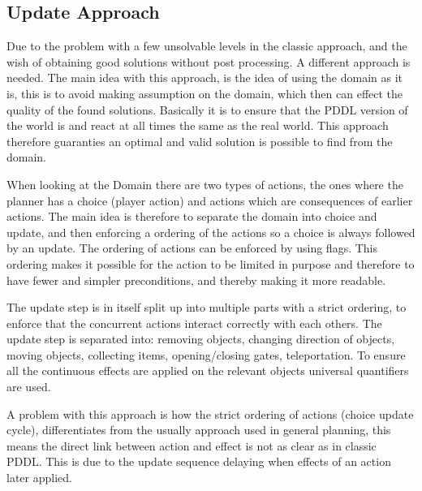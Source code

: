 		\subsection{Update Approach}
		Due to the problem with a few unsolvable levels in the classic approach, and the wish of obtaining good solutions without post processing. A different approach is needed. The main idea with this approach, is the idea of using the domain as it is, this is to avoid making assumption on the domain, which then can effect the quality of the found solutions. Basically it is to ensure that the PDDL version of the world is and react at all times the same as the real world. This approach therefore guaranties an optimal and valid solution is possible to find from the domain.
		
		When looking at the Domain there are two types of actions, the ones where the planner has a choice (player action) and actions which are consequences of earlier actions. The main idea is therefore to separate the domain into choice and update, and then enforcing a ordering of the actions so a choice is always followed by an update. The ordering of actions can be enforced by using flags. This ordering makes it possible for the action to be limited in purpose and therefore to have fewer and simpler preconditions, and thereby making it more readable.
		
		The update step is in itself split up into multiple parts with a strict ordering, to enforce that the concurrent actions interact correctly with each others. The update step is separated into: removing objects, changing direction of objects, moving objects, collecting items, opening/closing gates, teleportation. To ensure all the continuous effects are applied on the relevant objects universal quantifiers are used. 
		
		A problem with this approach is how the strict ordering of actions (choice update cycle), differentiates from the usually approach used in general planning, this means the direct link between action and effect is not as clear as in classic PDDL. This is due to the update sequence delaying when effects of an action later applied. 
		
	

	
	


